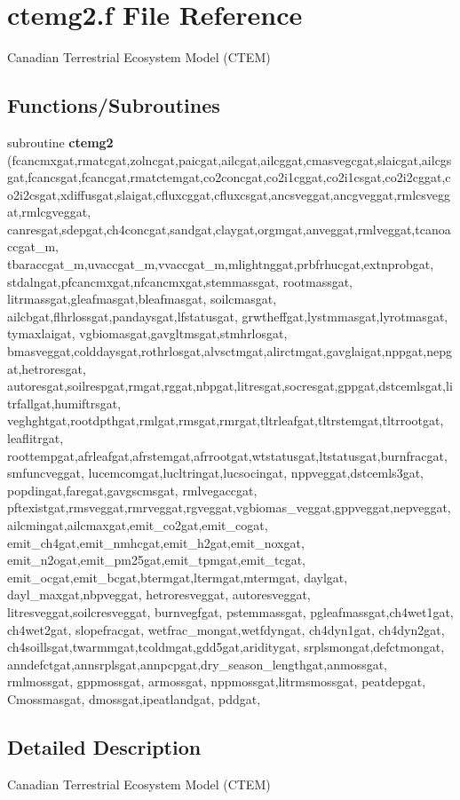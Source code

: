 \hypertarget{ctemg2_8f}{}\section{ctemg2.\+f File Reference}
\label{ctemg2_8f}


Canadian Terrestrial Ecosystem Model (C\+T\+E\+M)  


\subsection*{Functions/\+Subroutines}
\begin{DoxyCompactItemize}
\item 
\hypertarget{ctemg2_8f_ac3b8f34561a13007060d16f1995e4dde}{}subroutine {\bfseries ctemg2} (fcancmxgat,rmatcgat,zolncgat,paicgat,ailcgat,ailcggat,cmasvegcgat,slaicgat,ailcgsgat,fcancsgat,fcancgat,rmatctemgat,co2concgat,co2i1cggat,co2i1csgat,co2i2cggat,co2i2csgat,xdiffusgat,slaigat,cfluxcggat,cfluxcsgat,ancsveggat,ancgveggat,rmlcsveggat,rmlcgveggat, canresgat,sdepgat,ch4concgat,sandgat,claygat,orgmgat,anveggat,rmlveggat,tcanoaccgat\+\_\+m, tbaraccgat\+\_\+m,uvaccgat\+\_\+m,vvaccgat\+\_\+m,mlightnggat,prbfrhucgat,extnprobgat, stdalngat,pfcancmxgat,nfcancmxgat,stemmassgat, rootmassgat, litrmassgat,gleafmasgat,bleafmasgat, soilcmasgat, ailcbgat,flhrlossgat,pandaysgat,lfstatusgat, grwtheffgat,lystmmasgat,lyrotmasgat, tymaxlaigat, vgbiomasgat,gavgltmsgat,stmhrlosgat, bmasveggat,colddaysgat,rothrlosgat,alvsctmgat,alirctmgat,gavglaigat,nppgat,nepgat,hetroresgat, autoresgat,soilrespgat,rmgat,rggat,nbpgat,litresgat,socresgat,gppgat,dstcemlsgat,litrfallgat,humiftrsgat, veghghtgat,rootdpthgat,rmlgat,rmsgat,rmrgat,tltrleafgat,tltrstemgat,tltrrootgat, leaflitrgat, roottempgat,afrleafgat,afrstemgat,afrrootgat,wtstatusgat,ltstatusgat,burnfracgat, smfuncveggat, lucemcomgat,lucltringat,lucsocingat, nppveggat,dstcemls3gat, popdingat,faregat,gavgscmsgat, rmlvegaccgat, pftexistgat,rmsveggat,rmrveggat,rgveggat,vgbiomas\+\_\+veggat,gppveggat,nepveggat,ailcmingat,ailcmaxgat,emit\+\_\+co2gat,emit\+\_\+cogat, emit\+\_\+ch4gat,emit\+\_\+nmhcgat,emit\+\_\+h2gat,emit\+\_\+noxgat, emit\+\_\+n2ogat,emit\+\_\+pm25gat,emit\+\_\+tpmgat,emit\+\_\+tcgat, emit\+\_\+ocgat,emit\+\_\+bcgat,btermgat,ltermgat,mtermgat, daylgat, dayl\+\_\+maxgat,nbpveggat, hetroresveggat, autoresveggat, litresveggat,soilcresveggat, burnvegfgat, pstemmassgat, pgleafmassgat,ch4wet1gat, ch4wet2gat, slopefracgat, wetfrac\+\_\+mongat,wetfdyngat, ch4dyn1gat, ch4dyn2gat, ch4soillsgat,twarmmgat,tcoldmgat,gdd5gat,ariditygat, srplsmongat,defctmongat, anndefctgat,annsrplsgat,annpcpgat,dry\+\_\+season\+\_\+lengthgat,anmossgat, rmlmossgat, gppmossgat, armossgat, nppmossgat,litrmsmossgat, peatdepgat, Cmossmasgat, dmossgat,ipeatlandgat, pddgat,\label{ctemg2_8f_ac3b8f34561a13007060d16f1995e4dde}

\end{DoxyCompactItemize}


\subsection{Detailed Description}
Canadian Terrestrial Ecosystem Model (C\+T\+E\+M) 

